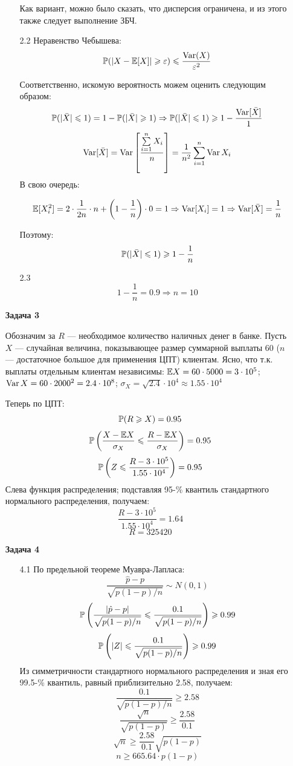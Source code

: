 \documentclass[12pt, a4paper]{article}\usepackage[]{graphicx}\usepackage[]{color}
\begin{document}
\begin{enumerate}
\begin{enumerate}
Как вариант, можно было сказать, что дисперсия ограничена, и из этого также следует выполнение ЗБЧ.
\item[2.2] Неравенство Чебышева:
$$
\P(|X-\E[X]|\geqslant \varepsilon) \leqslant \frac{\Var(X)}{\varepsilon^2}
$$

Соответственно, искомую вероятность можем оценить следующим образом:
$$
\P(|\bar{X}| \leqslant 1) = 1 -\P(|\bar{X}| \geqslant 1) \Rightarrow \P(|\bar{X}| \leqslant 1) \geqslant 1 - \frac{\Var[\bar{X}]}{1}
$$
$$
\Var[\bar{X}] = \Var\left[\frac{\sum\limits_{i=1}^{n} X_i}{n}\right] = \frac{1}{n^2}\sum \limits_{i=1}^{n} \Var{X_i}
$$
В свою очередь:

$$
\E[X_i^2] = 2\cdot\frac{1}{2n}\cdot n + \left(1-\frac{1}{n}\right)\cdot0 = 1 \Rightarrow \Var[X_i] = 1 \Rightarrow \Var[\bar{X}] = \frac{1}{n}
$$

Поэтому:
$$
\P(|\bar{X}| \leqslant 1)\geqslant 1 - \frac{1}{n}
$$

\item[2.3 ]  $$1 - \frac{1}{n} = 0.9  \Rightarrow n = 10$$

\end{enumerate}

\item[\textbf{Задача 3}]

Обозначим за $R$ — необходимое количество наличных денег в банке. Пусть $X$ — случайная величина, показывающее размер суммарной выплаты $60$ ($n$ — достаточное большое для применения ЦПТ) клиентам. Ясно, что т.к. выплаты отдельным клиентам независимы: \( \E X = 60 \cdot 5000 = 3\cdot 10^5 \); \( \Var X = 60 \cdot 2000^2 = 2.4 \cdot 10^8 \); \( \sigma_X = \sqrt{2.4} \cdot 10^4 \approx 1.55 \cdot 10^4\)

Теперь по ЦПТ:
\[\P(R \geqslant X) = 0.95 \]
\[\P \left(\dfrac{X - \E X}{\sigma_X} \leqslant \dfrac{R - \E X}{\sigma_X} \right) = 0.95 \]
\[ \P \left( Z \leqslant \dfrac{R - 3 \cdot 10^5}{1.55 \cdot 10^4} \right) = 0.95 \]
Слева функция распределения; подставляя 95-\% квантиль стандартного нормального распределения, получаем:
\[ \dfrac{R - 3 \cdot 10^5}{1.55 \cdot 10^4} = 1.64 \]
\[ R = 325420 \]


\item[\textbf{Задача 4}]

\begin{enumerate}
\item[4.1] По предельной теореме Муавра-Лапласа:
\[ \dfrac{\hat{p} - p}{\sqrt{p(1-p)/n}} \sim N (0,1) \]
\[ \P \left( \dfrac{|\hat{p} - p|}{\sqrt{p(1-p)/n}} \leqslant \dfrac{0.1}{\sqrt{p(1-p)/n}} \right) \geqslant 0.99 \]
\[ \P \left( |Z| \leqslant \dfrac{0.1}{\sqrt{p(1-p)/n}} \right) \geqslant 0.99 \]
Из симметричности стандартного нормального распределения и зная его 99.5-\% квантиль, равный приблизительно 2.58, получаем:
\[ \dfrac{0.1}{\sqrt{p(1-p)/n}} \geqslant 2.58 \]
\[ \dfrac{\sqrt{n}}{\sqrt{p(1-p)}} \geqslant \dfrac{2.58}{0.1} \]
\[ \sqrt{n} \geqslant \dfrac{2.58}{0.1} \sqrt{p(1-p)} \]
\[ n \geqslant 665.64 \cdot p(1-p) \]


\end{enumerate}
\end{enumerate}
\end{document}
